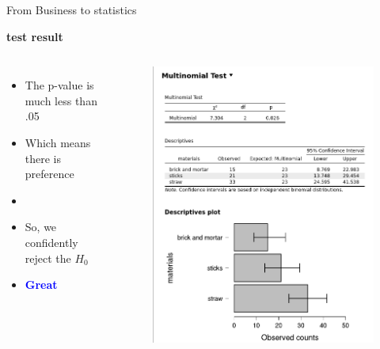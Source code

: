 \documentclass[8pt]{beamer}
\begin{document}
\begin{frame}{From Business to statistics}
            \begin{block}{\textbf{test result}}
                \begin{columns}
                    \begin{itemize}
                        \item The p-value is much less than .05
                        \item Which means there is preference
                        \item \item So, we confidently reject the $H_0$
                        \item \textcolor{blue}{\textbf{Great}}
                    \end{itemize}
                    \begin{figure}
                        \includegraphics[height=.5\textheight]{images/chi.png}
                    \end{figure}
                \end{columns}
            \end{block}
        \end{frame}
    
\end{document}
